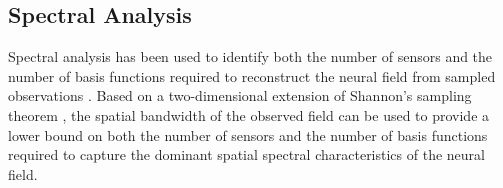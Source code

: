 \documentclass[review,authoryear,3p]{elsarticle}
\begin{document}

\subsection{Spectral Analysis}\label{SpectralAnalysisSection} 
Spectral analysis has been used to identify both the number of sensors and the number of basis functions required to reconstruct the neural field from sampled observations \citep{Sanner1992,Scerri2009}. Based on a two-dimensional extension of Shannon's sampling theorem \citep{Peterson1962}, the spatial bandwidth of the observed field can be used to provide a lower bound on both the number of sensors and the number of basis functions required to capture the dominant spatial spectral characteristics of the neural field.
\end{document}
